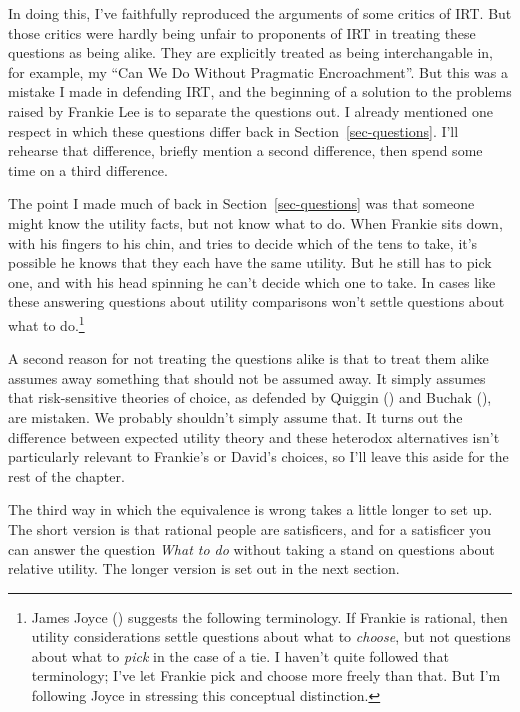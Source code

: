 \documentclass[
  12pt,
  letterpaper,
]{scrbook}
\begin{document}
In doing this, I've faithfully reproduced the arguments of some critics
of IRT. But those critics were hardly being unfair to proponents of IRT
in treating these questions as being alike. They are explicitly treated
as being interchangable in, for example, my ``Can We Do Without
Pragmatic Encroachment''. But this was a mistake I made in defending
IRT, and the beginning of a solution to the problems raised by Frankie
Lee is to separate the questions out. I already mentioned one respect in
which these questions differ back in Section~\ref{sec-questions}. I'll
rehearse that difference, briefly mention a second difference, then
spend some time on a third difference.

The point I made much of back in Section~\ref{sec-questions} was that
someone might know the utility facts, but not know what to do. When
Frankie sits down, with his fingers to his chin, and tries to decide
which of the tens to take, it's possible he knows that they each have
the same utility. But he still has to pick one, and with his head
spinning he can't decide which one to take. In cases like these
answering questions about utility comparisons won't settle questions
about what to do.\footnote{James Joyce ()
  suggests the following terminology. If Frankie is rational, then
  utility considerations settle questions about what to \emph{choose},
  but not questions about what to \emph{pick} in the case of a tie. I
  haven't quite followed that terminology; I've let Frankie pick and
  choose more freely than that. But I'm following Joyce in stressing
  this conceptual distinction.}

A second reason for not treating the questions alike is that to treat
them alike assumes away something that should not be assumed away. It
simply assumes that risk-sensitive theories of choice, as defended by
Quiggin () and Buchak
(), are mistaken. We probably shouldn't
simply assume that. It turns out the difference between expected utility
theory and these heterodox alternatives isn't particularly relevant to
Frankie's or David's choices, so I'll leave this aside for the rest of
the chapter.

The third way in which the equivalence is wrong takes a little longer to
set up. The short version is that rational people are satisficers, and
for a satisficer you can answer the question \emph{What to do} without
taking a stand on questions about relative utility. The longer version
is set out in the next section.
\end{document}
